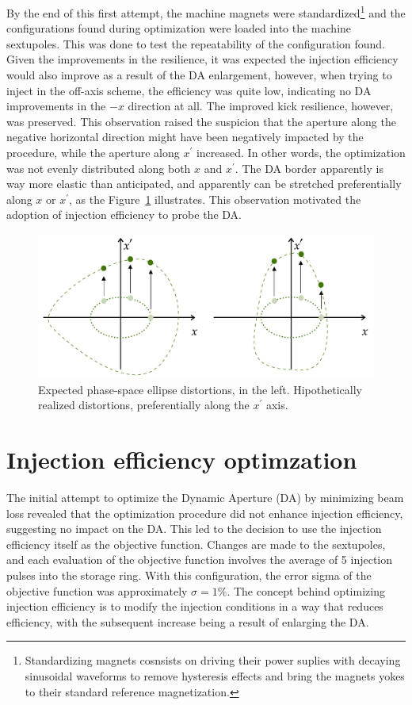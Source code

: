 By the end of this first attempt, the machine magnets were standardized\footnote{Standardizing magnets cosnsists on driving their power suplies with decaying sinusoidal waveforms to remove hysteresis effects and bring the magnets yokes to their standard reference magnetization.} and the configurations found during optimization were loaded into the machine sextupoles. This was done to test the repeatability of the configuration found. Given the improvements in the resilience, it was expected the injection efficiency would also improve as a result of the DA enlargement, however, when trying to inject in the off-axis scheme, the efficiency was quite low, indicating no DA improvements in the $-x$ direction at all. The improved kick resilience, however, was preserved. This observation raised the suspicion that the aperture along the negative horizontal direction might have been negatively impacted by the procedure, while the aperture along $x^\prime$ increased. In other words, the optimization was not evenly distributed along both $x$ and $x^\prime$. The DA border apparently is way more elastic than anticipated, and apparently can be stretched preferentially along $x$ or $x^\prime$, as the Figure~\ref{fig:expected_vs_reality_DA} illustrates. This observation motivated the adoption of injection efficiency to probe the DA.
\begin{figure}
    \centering
    \includegraphics[width=\textwidth]{Images/elastic_phase_space_distortion.pdf}
    \caption{Expected phase-space ellipse distortions, in the left. Hipothetically realized distortions, preferentially along the $x^\prime$ axis.}
    \label{fig:expected_vs_reality_DA}
\end{figure}
\section{Injection efficiency optimzation}
The initial attempt to optimize the Dynamic Aperture (DA) by minimizing beam loss revealed that the optimization procedure did not enhance injection efficiency, suggesting no impact on the DA. This led to the decision to use the injection efficiency itself as the objective function. Changes are made to the sextupoles, and each evaluation of the objective function involves the average of 5 injection pulses into the storage ring. With this configuration, the error sigma of the objective function was approximately $\sigma=1\%$. The concept behind optimizing injection efficiency is to modify the injection conditions in a way that reduces efficiency, with the subsequent increase being a result of enlarging the DA.

